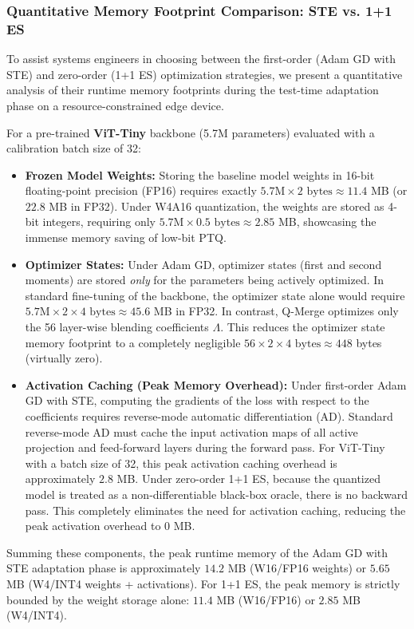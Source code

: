 \subsubsection{Quantitative Memory Footprint Comparison: STE vs. 1+1 ES}
To assist systems engineers in choosing between the first-order (Adam GD with STE) and zero-order (1+1 ES) optimization strategies, we present a quantitative analysis of their runtime memory footprints during the test-time adaptation phase on a resource-constrained edge device.

For a pre-trained \textbf{ViT-Tiny} backbone (5.7M parameters) evaluated with a calibration batch size of 32:
\begin{itemize}
    \item \textbf{Frozen Model Weights:} Storing the baseline model weights in 16-bit floating-point precision (FP16) requires exactly $5.7\text{M} \times 2 \text{ bytes} \approx 11.4$ MB (or $22.8$ MB in FP32). Under W4A16 quantization, the weights are stored as 4-bit integers, requiring only $5.7\text{M} \times 0.5 \text{ bytes} \approx 2.85$ MB, showcasing the immense memory saving of low-bit PTQ.
    \item \textbf{Optimizer States:} Under Adam GD, optimizer states (first and second moments) are stored \emph{only} for the parameters being actively optimized. In standard fine-tuning of the backbone, the optimizer state alone would require $5.7\text{M} \times 2 \times 4 \text{ bytes} \approx 45.6$ MB in FP32. In contrast, Q-Merge optimizes only the 56 layer-wise blending coefficients $\Lambda$. This reduces the optimizer state memory footprint to a completely negligible $56 \times 2 \times 4 \text{ bytes} \approx 448$ bytes (virtually zero).
    \item \textbf{Activation Caching (Peak Memory Overhead):} Under first-order Adam GD with STE, computing the gradients of the loss with respect to the coefficients requires reverse-mode automatic differentiation (AD). Standard reverse-mode AD must cache the input activation maps of all active projection and feed-forward layers during the forward pass. For ViT-Tiny with a batch size of 32, this peak activation caching overhead is approximately $2.8$ MB. Under zero-order 1+1 ES, because the quantized model is treated as a non-differentiable black-box oracle, there is no backward pass. This completely eliminates the need for activation caching, reducing the peak activation overhead to $0$ MB.
\end{itemize}

Summing these components, the peak runtime memory of the Adam GD with STE adaptation phase is approximately $14.2$ MB (W16/FP16 weights) or $5.65$ MB (W4/INT4 weights + activations). For 1+1 ES, the peak memory is strictly bounded by the weight storage alone: $11.4$ MB (W16/FP16) or $2.85$ MB (W4/INT4). 

